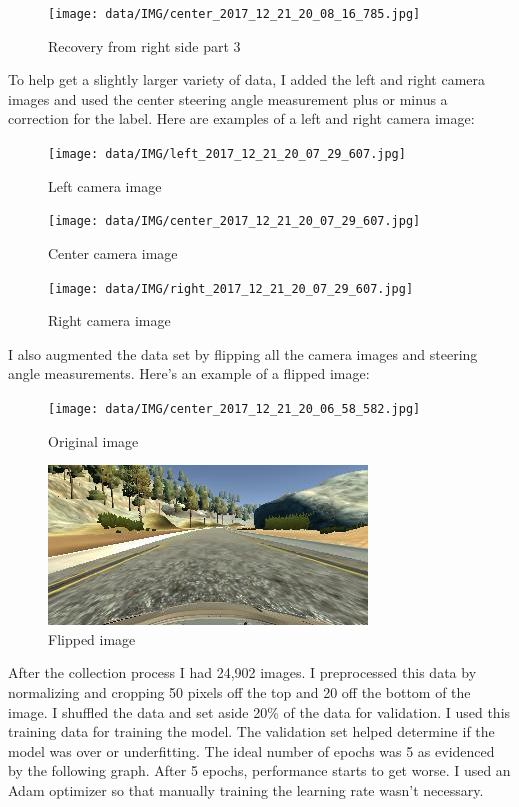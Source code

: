 \documentclass[12pt]{article}
\begin{document}
\begin{figure}[h]
\centering
\texttt{[image: data/IMG/center\_2017\_12\_21\_20\_08\_16\_785.jpg]}
\caption{Recovery from right side part 3}
\end{figure}


To help get a slightly larger variety of data, I added the left and right camera images and used the center steering angle measurement plus or minus a correction for the label. Here are examples of a left and right camera image:

\begin{figure}[!h]
\centering
\texttt{[image: data/IMG/left\_2017\_12\_21\_20\_07\_29\_607.jpg]}
\caption{Left camera image}
\end{figure}

\begin{figure}[H]
\centering
\texttt{[image: data/IMG/center\_2017\_12\_21\_20\_07\_29\_607.jpg]}
\caption{Center camera image}
\end{figure}

\begin{figure}[h]
\centering
\texttt{[image: data/IMG/right\_2017\_12\_21\_20\_07\_29\_607.jpg]}
\caption{Right camera image}
\end{figure}

I also augmented the data set by flipping all the camera images and steering angle measurements. Here's an example of a flipped image:
\begin{figure}[H]
\centering
\texttt{[image: data/IMG/center\_2017\_12\_21\_20\_06\_58\_582.jpg]}
\caption{Original image}
\end{figure}

\begin{figure}[h]
\centering
\includegraphics[scale = 1]{flipped_center_2017_12_21_20_06_58_582.jpg}
\caption{Flipped image}
\end{figure}

After the collection process I had 24,902 images. I preprocessed this data by normalizing and cropping 50 pixels off the top and 20 off the bottom of the image. I shuffled the data and set aside 20\% of the data for validation. I used this training data for training the model. The validation set helped determine if the model was over or underfitting. The ideal number of epochs was 5 as evidenced by the following graph. After 5 epochs, performance starts to get worse. I used an Adam optimizer so that manually training the learning rate wasn't necessary.
\end{document}
